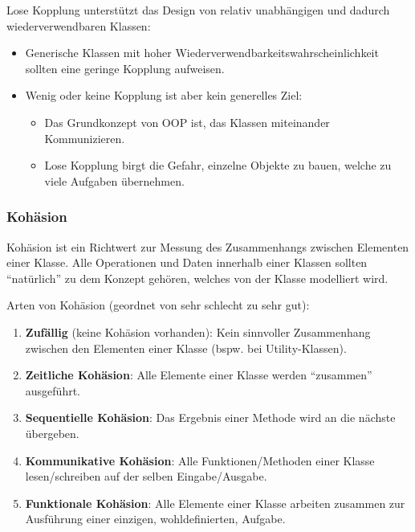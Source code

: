 \documentclass[ngerman]{tuda_summary}
\begin{document}
Lose Kopplung unterstützt das Design von relativ unabhängigen und dadurch wiederverwendbaren Klassen:
\begin{itemize}
    \item Generische Klassen mit hoher Wiederverwendbarkeitswahrscheinlichkeit sollten eine geringe Kopplung aufweisen.
    \item Wenig oder keine Kopplung ist aber kein generelles Ziel:
          \begin{itemize}
              \item Das Grundkonzept von OOP ist, das Klassen miteinander Kommunizieren.
              \item Lose Kopplung birgt die Gefahr, einzelne Objekte zu bauen, welche zu viele Aufgaben übernehmen.
          \end{itemize}
\end{itemize}



\subsubsection{Kohäsion}
Kohäsion ist ein Richtwert zur Messung des Zusammenhangs zwischen Elementen einer Klasse. Alle Operationen und Daten innerhalb einer Klassen sollten \enquote{natürlich} zu dem Konzept gehören, welches von der Klasse modelliert wird.

Arten von Kohäsion (geordnet von sehr schlecht zu sehr gut):
\begin{enumerate}
    \item \textbf{Zufällig} (keine Kohäsion vorhanden): Kein sinnvoller Zusammenhang zwischen den Elementen einer Klasse (bspw. bei Utility-Klassen).
    \item \textbf{Zeitliche Kohäsion}: Alle Elemente einer Klasse werden \enquote{zusammen} ausgeführt.
    \item \textbf{Sequentielle Kohäsion}: Das Ergebnis einer Methode wird an die nächste übergeben.
    \item \textbf{Kommunikative Kohäsion}: Alle Funktionen/Methoden einer Klasse lesen/schreiben auf der selben Eingabe/Ausgabe.
    \item \textbf{Funktionale Kohäsion}: Alle Elemente einer Klasse arbeiten zusammen zur Ausführung einer einzigen, wohldefinierten, Aufgabe.
\end{enumerate}
\end{document}
